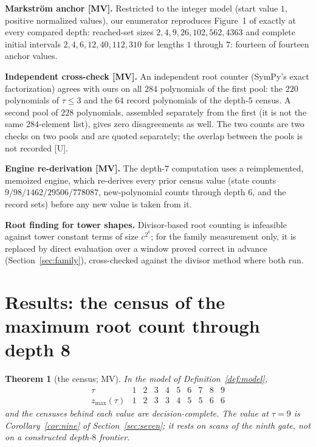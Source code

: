 \documentclass[11pt]{article}
\newtheorem{theorem}{Theorem}[section]
\theoremstyle{definition}
\theoremstyle{remark}
\newcommand{\zmax}{z_{\max}}
\begin{document}
\textbf{Markstr\"om anchor [MV].} Restricted to the integer model (start value $1$,
positive normalized values), our enumerator reproduces Figure~1 of
\cite{Markstrom2014} exactly at every compared depth: reached-set sizes
$2, 4, 9, 26, 102, 562, 4363$ and complete initial intervals
$2, 4, 6, 12, 40, 112, 310$ for lengths $1$ through $7$: fourteen of fourteen anchor
values.

\textbf{Independent cross-check [MV].} An independent root counter (SymPy's exact
factorization) agrees with ours on all $284$ polynomials of the first pool: the $220$
polynomials of $\tau \le 3$ and the $64$ record polynomials of the depth-$5$ census. A second
pool of $228$ polynomials, assembled separately from the first (it is not the same
$284$-element list), gives zero disagreements as well. The two counts are two checks on two
pools and are quoted separately; the overlap between the pools is not recorded [U].

\textbf{Engine re-derivation [MV].} The depth-$7$ computation uses a reimplemented,
memoized engine, which re-derives every prior census value (state counts
$9 / 98 / 1462 / 29506 / 778087$, new-polynomial counts through depth $6$, and the
record sets) before any new value is taken from it.

\textbf{Root finding for tower shapes.} Divisor-based root counting is infeasible
against tower constant terms of size $c^{2^k}$; for the family measurement only, it is
replaced by direct evaluation over a window proved correct in advance
(Section~\ref{sec:family}), cross-checked against the divisor method where both run.

\section{Results: the census of the maximum root count through depth 8}\label{sec:census}

\begin{theorem}[the census; MV]\label{thm:census}
In the model of Definition~\ref{def:model},
\[
\begin{array}{c|ccccccccc}
\tau & 1 & 2 & 3 & 4 & 5 & 6 & 7 & 8 & 9\\\hline
\zmax(\tau) & 1 & 2 & 3 & 3 & 4 & 5 & 5 & 6 & 6
\end{array}
\]
and the censuses behind each value are decision-complete. The value at $\tau = 9$
is Corollary~\ref{cor:nine} of Section~\ref{sec:seven}; it rests on scans of the
ninth gate, not on a constructed depth-$8$ frontier.
\end{theorem}
\end{document}
